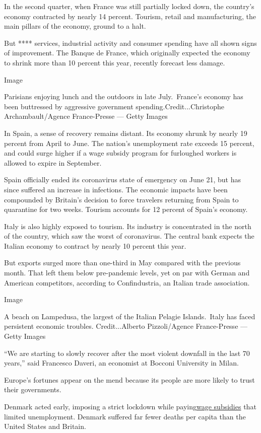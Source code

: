 In the second quarter, when France was still partially locked down, the
country's economy contracted by nearly 14 percent. Tourism, retail and
manufacturing, the main pillars of the economy, ground to a halt.

But **** services, industrial activity and consumer spending have all
shown signs of improvement. The Banque de France, which originally
expected the economy to shrink more than 10 percent this year, recently
forecast less damage.

Image

Parisians enjoying lunch and the outdoors in late July.~France's economy
has been buttressed by aggressive government
spending.Credit...Christophe Archambault/Agence France-Presse --- Getty
Images

In Spain, a sense of recovery remains distant. Its economy shrunk by
nearly 19 percent from April to June. The nation's unemployment rate
exceeds 15 percent, and could surge higher if a wage subsidy program for
furloughed workers is allowed to expire in September.

Spain officially ended its coronavirus state of emergency on June 21,
but has since suffered an increase in infections. The economic impacts
have been compounded by Britain's decision to force travelers returning
from Spain to quarantine for two weeks. Tourism accounts for 12 percent
of Spain's economy.

Italy is also highly exposed to tourism. Its industry is concentrated in
the north of the country, which saw the worst of coronavirus. The
central bank expects the Italian economy to contract by nearly 10
percent this year.

But exports surged more than one-third in May compared with the previous
month. That left them below pre-pandemic levels, yet on par with German
and American competitors, according to Confindustria, an Italian trade
association.

Image

A beach on Lampedusa, the largest of the Italian Pelagie Islands.~Italy
has faced persistent economic troubles. Credit...Alberto Pizzoli/Agence
France-Presse --- Getty Images

``We are starting to slowly recover after the most violent downfall in
the last 70 years,'' said Francesco Daveri, an economist at Bocconi
University in Milan.

Europe's fortunes appear on the mend because its people are more likely
to trust their governments.

Denmark acted early, imposing a strict lockdown while
paying\href{https://www.nytimes.com/2020/03/28/business/nordic-way-economic-rescue-virus.html}{wage
subsidies} that limited unemployment. Denmark suffered far fewer deaths
per capita than the United States and Britain.

